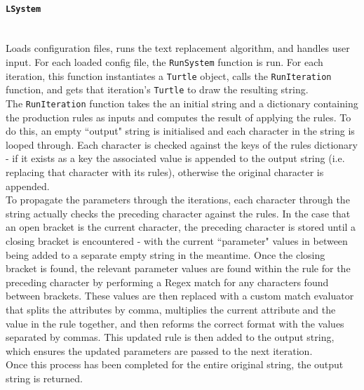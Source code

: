 \documentclass[12pt]{article}
\begin{document}
\paragraph{{\large\texttt{LSystem}}}\mbox{} \\
Loads configuration files, runs the text replacement algorithm, and handles user input. For each loaded config file, the \texttt{RunSystem} function is run. For each iteration, this function instantiates a \texttt{Turtle} object, calls the \texttt{RunIteration} function, and gets that iteration's \texttt{Turtle} to draw the resulting string.\\
The \texttt{RunIteration} function takes the an initial string and a dictionary containing the production rules as inputs and computes the result of applying the rules. To do this, an empty ``output" string is initialised and each character in the string is looped through. Each character is checked against the keys of the rules dictionary - if it exists as a key the associated value is appended to the output string (i.e. replacing that character with its rules), otherwise the original character is appended.\\
To propagate the parameters through the iterations, each character through the string actually checks the preceding character against the rules. In the case that an open bracket is the current character, the preceding character is stored until a closing bracket is encountered - with the current ``parameter" values in between being added to a separate empty string in the meantime. Once the closing bracket is found, the relevant parameter values are found within the rule for the preceding character by performing a Regex match for any characters found between brackets. These values are then replaced with a custom match evaluator that splits the attributes by comma,  multiplies the current attribute and the value in the rule together, and then reforms the correct format with the values separated by commas. This updated rule is then added to the output string, which ensures the updated parameters are passed to the next iteration.\\
Once this process has been completed for the entire original string, the output string is returned. 
\pagebreak
\end{document}
